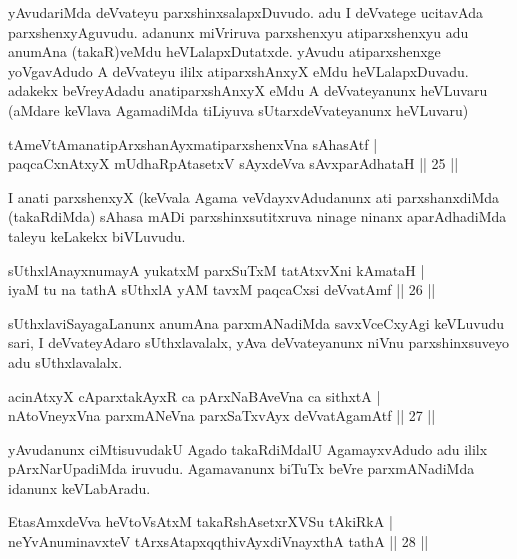 \begin{artha}
yAvudariMda deVvateyu parxshinxsalapxDuvudo. adu I deVvatege ucitavAda parxshenxyAguvudu. adanunx miVriruva parxshenxyu atiparxshenxyu adu anumAna (takaR)veMdu heVLalapxDutatxde. yAvudu atiparxshenxge yoVgavAdudo A deVvateyu ililx atiparxshAnxyX eMdu heVLalapxDuvadu. adakekx beVreyAdadu anatiparxshAnxyX eMdu A deVvateyanunx heVLuvaru (aMdare keVlava AgamadiMda tiLiyuva sUtarxdeVvateyanunx heVLuvaru)
\end{artha}%

\begin{shl}
tAmeVtAmanatipArxshanAyxmatiparxshenxVna sAhasAtf |\\
paqcaCxnAtxyX mUdhaRpAtasetxV sAyxdeVva sAvxparAdhataH \hfill || 25 ||
\end{shl}

\begin{artha}
I anati parxshenxyX (keVvala Agama veVdayxvAdudanunx ati parxshanxdiMda (takaRdiMda) sAhasa mADi parxshinxsutitxruva ninage ninanx aparAdhadiMda taleyu keLakekx biVLuvudu.
\end{artha}

\begin{shl}
sUthxlAnayxnumayA yukatxM parxSuTxM tatAtxvXni kAmataH |\\
iyaM tu na tathA sUthxlA yAM tavxM paqcaCxsi deVvatAmf \hfill || 26 ||
\end{shl}

\begin{artha}
sUthxlaviSayagaLanunx anumAna parxmANadiMda savxVceCxyAgi keVLuvudu sari, I deVvateyAdaro sUthxlavalalx, yAva deVvateyanunx niVnu parxshinxsuveyo adu sUthxlavalalx.
\end{artha}

\begin{shl}
acinAtxyX cAparxtakAyxR ca pArxNaBAveVna ca sithxtA |\\
nAtoV\s neyxVna parxmANeVna parxSaTxvAyx deVvatA\s \s gamAtf \hfill || 27 ||
\end{shl}

\begin{artha}
yAvudanunx ciMtisuvudakU Agado takaRdiMdalU AgamayxvAdudo adu ililx pArxNarUpadiMda iruvudu. Agamavanunx biTuTx beVre parxmANadiMda idanunx keVLabAradu.
\end{artha}

\begin{shl}
EtasAmxdeVva heVtoVsAtxM takaRshAsetxrXVSu tAkiRkA |\\
neYvAnuminavxteV tArxsAtapxqqthivAyxdiVnayxthA tathA \hfill || 28 ||
\end{shl}

